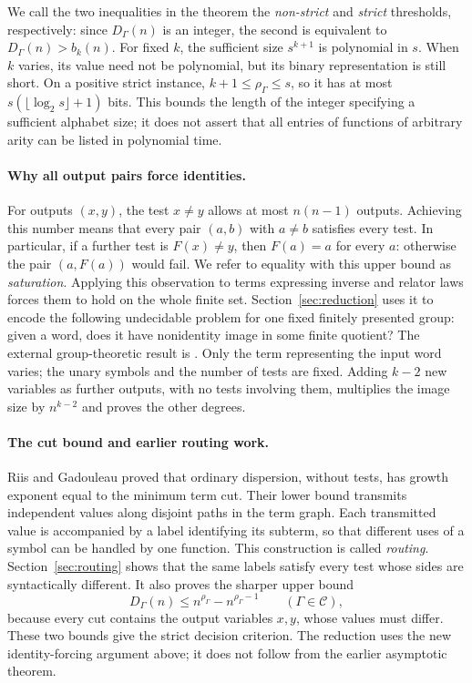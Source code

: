 \documentclass[12pt]{article}
\theoremstyle{definition}
\begin{document}
We call the two inequalities in the theorem the \emph{non-strict} and
\emph{strict} thresholds, respectively: since $D_\Gamma(n)$ is an
integer, the second is equivalent to $D_\Gamma(n)>b_k(n)$.
For fixed $k$, the sufficient size $s^{k+1}$ is polynomial in $s$.
When $k$ varies, its value need not be polynomial, but its binary
representation is still short. On a positive strict instance,
$k+1\le\rho_\Gamma\le s$, so it has at most
$s(\lfloor\log_2 s\rfloor+1)$ bits. This bounds the length of the
integer specifying a sufficient alphabet size; it does not assert that
all entries of functions of arbitrary arity can be listed in polynomial
time.

\paragraph{Why all output pairs force identities.}
For outputs $(x,y)$, the test $x\ne y$ allows at most $n(n-1)$ outputs.
Achieving this number means that every pair $(a,b)$ with $a\ne b$
satisfies every test. In particular, if a further test is $F(x)\ne y$,
then $F(a)=a$ for every $a$: otherwise the pair $(a,F(a))$ would fail.
We refer to equality with this upper bound as \emph{saturation}.
Applying this observation to terms expressing inverse and relator laws
forces them to hold on the whole finite set. Section~\ref{sec:reduction}
uses it to encode the following undecidable problem for one fixed
finitely presented group: given a word, does it have nonidentity image
in some finite quotient? The external group-theoretic result is
\cite[Theorem 2.1]{BW}. Only the term representing the input word varies;
the unary symbols and the number of tests are fixed.
Adding $k-2$ new variables as further outputs, with no tests involving
them, multiplies the image size by $n^{k-2}$ and proves the other degrees.

\paragraph{The cut bound and earlier routing work.}
Riis and Gadouleau \cite{RG} proved that ordinary dispersion, without
tests, has growth exponent equal to the minimum term cut. Their lower
bound transmits independent values along disjoint paths in the term
graph. Each transmitted value is accompanied by a label identifying
its subterm, so that different uses of a symbol can be handled by one
function. This construction is called \emph{routing}.
Section~\ref{sec:routing} shows that the same labels satisfy every test
whose sides are syntactically different. It also proves the sharper
upper bound
\[
 D_\Gamma(n)\le n^{\rho_\Gamma}-n^{\rho_\Gamma-1}
 \qquad(\Gamma\in\mathcal C),
\]
because every cut contains the output variables $x,y$, whose values
must differ. These two bounds give the strict decision criterion.
The reduction uses the new identity-forcing argument above; it does
not follow from the earlier asymptotic theorem.
\end{document}
